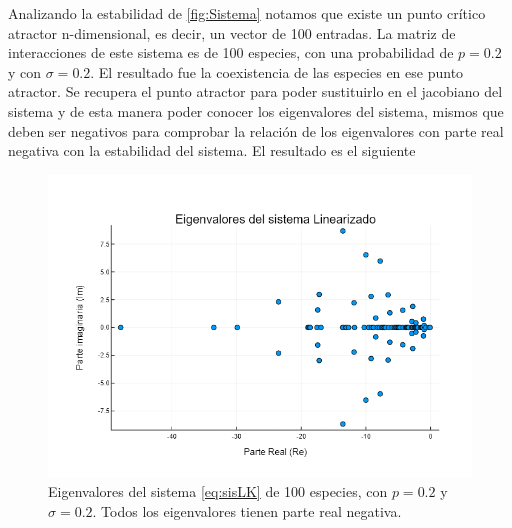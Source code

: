 \documentclass[11pt,a4paper]{article}
\begin{document}
Analizando la estabilidad de \ref{fig:Sistema} notamos que existe un punto crítico atractor n-dimensional, es decir, un vector de 100 entradas. La matriz de interacciones de este sistema es de 100 especies, con una probabilidad de $p=0.2$ y con $\sigma=0.2$. El resultado fue la coexistencia de las especies en ese punto atractor. Se recupera el punto atractor para poder sustituirlo en el jacobiano del sistema y de esta manera poder conocer los eigenvalores del sistema, mismos que deben ser negativos para comprobar la relación de los eigenvalores con parte real negativa con la estabilidad del sistema. El resultado es el siguiente
\begin{figure}[h!]
\centering
\includegraphics[scale=0.305]{Eigenvalores}
\caption{Eigenvalores del sistema \ref{eq:sisLK} de 100 especies, con $p=0.2$ y $\sigma=0.2$. Todos los eigenvalores tienen parte real negativa.}
\end{figure}
\end{document}
